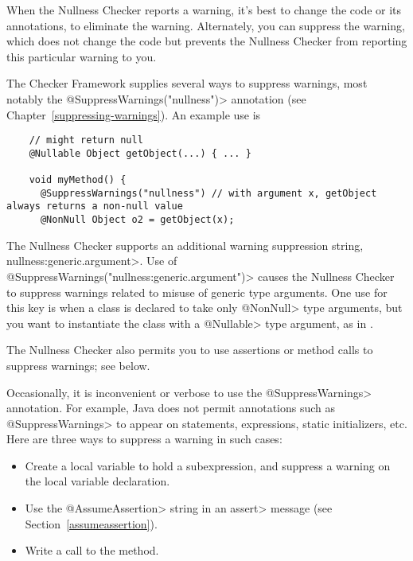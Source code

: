 When the Nullness Checker reports a warning, it's best to change the code
or its annotations, to eliminate the warning.  Alternately, you can
suppress the warning, which does not change the code but prevents the
Nullness Checker from reporting this particular warning to you.

\begin{sloppypar}
The Checker Framework supplies several ways to suppress warnings, most
notably the \<@SuppressWarnings("nullness")> annotation (see
Chapter~\ref{suppressing-warnings}).  An example use is
\end{sloppypar}

\begin{smaller}
\begin{Verbatim}
    // might return null
    @Nullable Object getObject(...) { ... }

    void myMethod() {
      @SuppressWarnings("nullness") // with argument x, getObject always returns a non-null value
      @NonNull Object o2 = getObject(x);
\end{Verbatim}
\end{smaller}


The Nullness Checker supports an additional warning suppression string,
\<nullness:generic.argument>.
Use of \<@SuppressWarnings("nullness:generic.argument")> causes the Nullness
Checker to suppress warnings related to misuse of generic type
arguments.  One use for this key is when a class is declared to take only
\<@NonNull> type arguments, but you want to instantiate the class with a
\<@Nullable> type argument, as in .

The Nullness Checker also permits you to use assertions or method calls to
suppress warnings; see below.




Occasionally, it is inconvenient or
verbose to use the \<@SuppressWarnings> annotation.  For example, Java does
not permit annotations such as \<@SuppressWarnings> to appear on
statements, expressions, static initializers, etc.
Here are three ways to suppress a warning in such cases:
\begin{itemize}
\item
  Create a local variable to hold a subexpression, and
  suppress a warning on the local variable declaration.
\item
  Use the \<@AssumeAssertion> string in
  an \<assert> message (see Section~\ref{assumeassertion}).
\item
  Write a call to the
   method.
\end{itemize}

